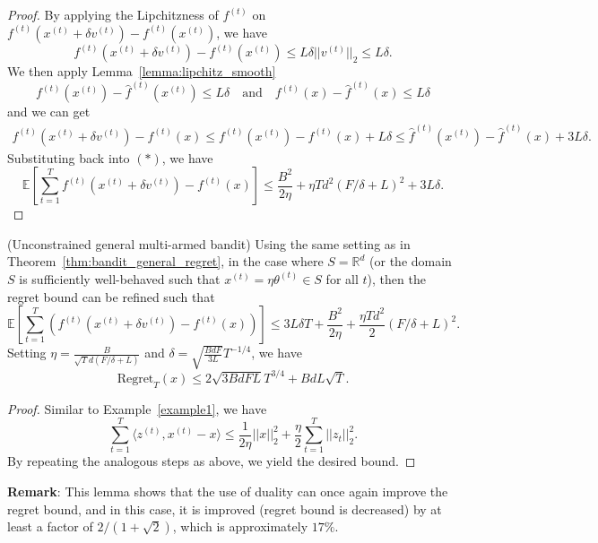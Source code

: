 \begin{proof}
    By applying the Lipchitzness of $f^{(t)}$ on $f^{(t)}(x^{(t)} + \delta v^{(t)}) - f^{(t)}(x^{(t)})$, we have 
    $$
    f^{(t)}(x^{(t)} + \delta v^{(t)}) - f^{(t)}(x^{(t)}) \leq L \delta ||v^{(t)}||_2 \leq L \delta.
    $$
    We then apply Lemma~\ref{lemma:lipchitz_smooth}
    $$ f^{(t)}(x^{(t)}) - \hat{f}^{(t)}(x^{(t)}) \leq L \delta \quad \text{and} \quad f^{(t)}(x) - \hat{f}^{(t)}(x) \leq L \delta $$
    and we can get
    \begin{align*}
        f^{(t)}(x^{(t)} + \delta v^{(t)}) - f^{(t)}(x) \leq f^{(t)}(x^{(t)}) - f^{(t)}(x) + L \delta \leq \hat{f}^{(t)}(x^{(t)}) - \hat{f}^{(t)}(x) + 3L\delta.
    \end{align*}
    Substituting back into $(*)$, we have
    $$
    \mathbb{E}\left[\sum_{t=1}^T f^{(t)}(x^{(t)} + \delta v^{(t)}) - f^{(t)}(x) \right] \leq \frac{B^2}{2\eta} + \eta T d^2 (F/\delta + L)^2 + 3L \delta.
    $$
\end{proof}

\begin{lemma}{(Unconstrained general multi-armed bandit)}
    Using the same setting as in Theorem~\ref{thm:bandit_general_regret}, in the case where $S = \mathbb{R}^d$ (or the domain $S$ is sufficiently well-behaved such that $x^{(t)} = \eta \theta^{(t)} \in S$ for all $t$), then the regret bound can be refined such that 
    $$
    \mathbb{E}\left[\sum_{t=1}^T \left(f^{(t)}(x^{(t)} + \delta v^{(t)}) - f^{(t)}(x)\right)\right]
    \leq 3L\delta T + \frac{B^2}{2\eta} + \frac{\eta T d^2}{2} (F/\delta + L)^2.
    $$
    Setting $\eta=\frac{B}{\sqrt{T}d(F/\delta + L)}$ and $\delta = \sqrt{\frac{BdF}{3L}}T^{-1/4}$, we have
    $$
    \text{Regret}_T(x) \leq 2\sqrt{3BdFL}T^{3/4} + BdL\sqrt{T}.
    $$
\end{lemma}
\begin{proof}
    Similar to Example~\ref{example1}, we have 
    $$ \sum_{t=1}^T \langle z^{(t)}, x^{(t)} - x \rangle \leq \frac{1}{2\eta}||x||_2^2 + \frac{\eta}{2} \sum_{t=1}^T ||z_t||_2^2.
    $$
    By repeating the analogous steps as above, we yield the desired bound.
\end{proof}
\noindent \textbf{Remark}: This lemma shows that the use of duality can once again improve the regret bound, and in this case, it is improved (regret bound is decreased) by at least a factor of $2/(1+\sqrt{2})$, which is approximately $17\%$.


